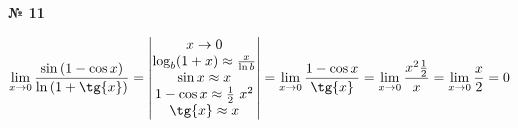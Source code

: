\documentclass{article}
\begin{document}
\textbf{№ 11} 
\large

$$ \lim\limits_{x \to 0} \frac{\sin{(1-\cos{x})}}{\ln{(1+\tg{x})}}
= \begin{vmatrix}
        x \to 0 \\
        \log_b(1+x) \approx \frac{x}{\ln{b}} \\
        \sin{x} \approx x \\
        1 - \cos{x} \approx \frac{1}{2} \ x^2 \\
        \tg{x} \approx x
   \end{vmatrix}
= \lim\limits_{x \to 0} \frac{1-\cos{x}}{\tg{x}}
= \lim\limits_{x \to 0} \frac{x^2 \frac{1}{2}}{x}
= \lim\limits_{x \to 0} \frac{x}{2}
= 0 $$  
\end{document}
